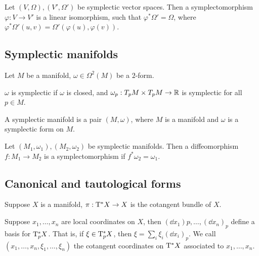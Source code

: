\begin{definition}
    [symplectomorphism] Let \((V, \Omega), (V', \Omega')\) be symplectic vector spaces. Then a symplectomorphism \(\varphi : V \to V'\) is a linear isomorphism, such that \(\varphi^*\Omega' = \Omega\), where \(\varphi^*\Omega'(u, v) = \Omega'(\varphi(u), \varphi(v))\).
\end{definition}

\subsection{Symplectic manifolds}

Let \(M\) be a manifold, \(\omega \in \Omega^2(M)\) be a \(2\)-form.

\begin{definition}
     \(\omega\) is symplectic if \(\omega\) is closed, and \(\omega_p : T_pM \times T_pM \to \mathbb{R}\) is symplectic for all \(p \in M\).
\end{definition}

\begin{definition}
     A symplectic manifold is a pair \((M, \omega)\), where \(M\) is a manifold and \(\omega\) is a symplectic form on \(M\).
\end{definition}

\begin{definition}
    [symplectomorphism] Let \((M_1, \omega_1), (M_2, \omega_2)\) be symplectic manifolds. Then a diffeomorphism \(f : M_1 \to M_2\) is a symplectomorphism if \(f^*\omega_2 = \omega_1\).
\end{definition}

\subsection{Canonical and tautological forms}

Suppose \(X\) is a manifold, \(\pi : \mathrm{T}^*X \to X\) is the cotangent bundle of \(X\).

\begin{definition}
     Suppose \(x_1, \dots, x_n\) are local coordinates on \(X\), then \((\dd x_1)p, \dots, (\dd x_n)_p\) define a basis for \(\mathrm{T}^*_p X\). That is, if \(\xi \in \mathrm{T}^*_pX\), then \(\xi = \sum_i \xi_i (\dd x_i)_p\). We call \((x_1, \dots, x_n, \xi_1, \dots, \xi_n)\) the cotangent coordinates on \(\mathrm{T}^*X\) associated to \(x_1, \dots, x_n\).
\end{definition}


